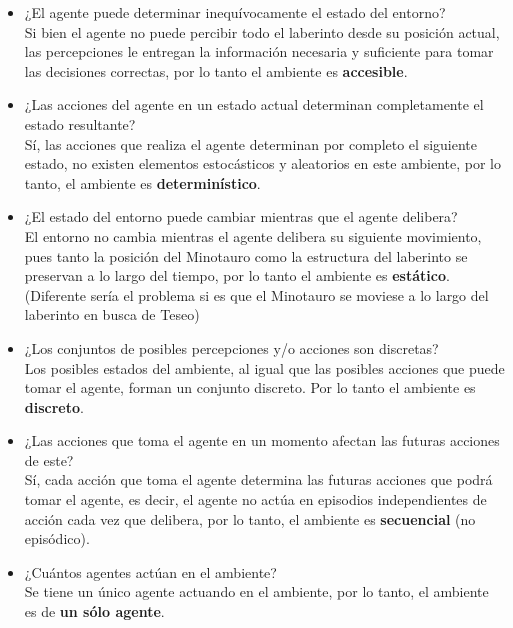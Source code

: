 \documentclass[letter, titlepage, 10pt]{article}
\begin{document}
\begin{itemize}
\item ¿El agente puede determinar inequívocamente el estado del entorno?\\
Si bien el agente no puede percibir todo el laberinto desde su posición actual, las percepciones le entregan la información necesaria y suficiente para tomar las decisiones correctas, por lo tanto el ambiente es \textbf{accesible}.

\item ¿Las acciones del agente en un estado actual determinan completamente el estado resultante?\\
Sí, las acciones que realiza el agente determinan por completo el siguiente estado, no existen elementos estocásticos y aleatorios en este ambiente, por lo tanto, el ambiente es \textbf{determinístico}.

\item ¿El estado del entorno puede cambiar mientras que el agente delibera?\\ El entorno no cambia mientras el agente delibera su siguiente movimiento, pues tanto la posición del Minotauro como la estructura del laberinto se preservan a lo largo del tiempo, por lo tanto el ambiente es \textbf{estático}. (Diferente sería el problema si es que el Minotauro se moviese a lo largo del laberinto en busca de Teseo)

\item ¿Los conjuntos de posibles percepciones y/o acciones son discretas?\\
Los posibles estados del ambiente, al igual que las posibles acciones que puede tomar el agente, forman un conjunto discreto. Por lo tanto el ambiente es \textbf{discreto}.

\item ¿Las acciones que toma el agente en un momento afectan las futuras acciones de este?\\
Sí, cada acción que toma el agente determina las futuras acciones que podrá tomar el agente, es decir, el agente no actúa en episodios independientes de acción cada vez que delibera, por lo tanto, el ambiente es \textbf{secuencial} (no episódico).

\item ¿Cuántos agentes actúan en el ambiente?\\
Se tiene un único agente actuando en el ambiente, por lo tanto, el ambiente es de \textbf{un sólo agente}.
\end{itemize}
\end{document}
